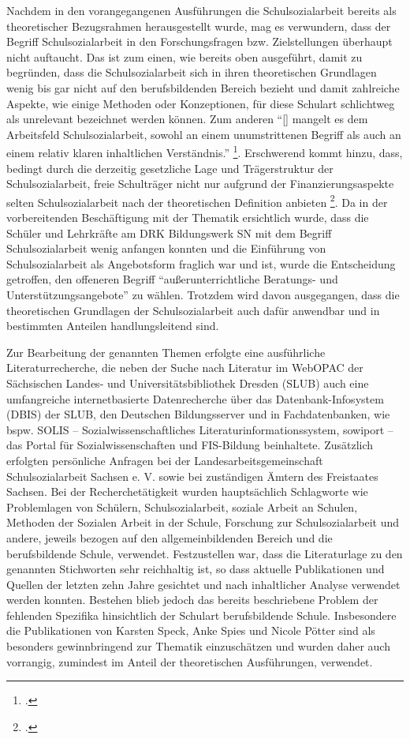 Nachdem in den vorangegangenen Ausführungen die Schulsozialarbeit bereits als theoretischer Bezugsrahmen herausgestellt wurde, mag es verwundern, dass der Begriff Schulsozialarbeit in den Forschungsfragen bzw. Zielstellungen überhaupt nicht auftaucht. Das ist zum einen, wie bereits oben ausgeführt, damit zu begründen, dass die Schulsozialarbeit sich in ihren theoretischen Grundlagen wenig bis gar nicht auf den berufsbildenden Bereich bezieht und damit zahlreiche Aspekte, wie einige Methoden oder Konzeptionen, für diese Schulart schlichtweg als unrelevant bezeichnet werden können. Zum anderen "`[\punkte] mangelt es dem Arbeitsfeld Schulsozialarbeit, sowohl an einem unumstrittenen Begriff als auch an einem relativ klaren inhaltlichen Verständnis."' \footcite[23]{Speck2007}. Erschwerend kommt hinzu, dass, bedingt durch die derzeitig gesetzliche Lage und Trägerstruktur der Schulsozialarbeit, freie Schulträger nicht nur aufgrund der Finanzierungsaspekte selten Schulsozialarbeit nach der theoretischen Definition anbieten \footcite[vgl.][116]{Stuewe2015}. Da in der vorbereitenden Beschäftigung mit der Thematik ersichtlich wurde, dass die Schüler und Lehrkräfte am DRK Bildungswerk SN mit dem Begriff Schulsozialarbeit wenig anfangen konnten und die Einführung von Schulsozialarbeit als Angebotsform fraglich war und ist, wurde die Entscheidung getroffen, den offeneren Begriff "`außerunterrichtliche Beratungs- und Unterstützungsangebote"' zu wählen. Trotzdem wird davon ausgegangen, dass die theoretischen Grundlagen der Schulsozialarbeit auch dafür anwendbar und in bestimmten Anteilen handlungsleitend sind.
 
Zur Bearbeitung der genannten Themen erfolgte eine ausführliche Literaturrecherche, die neben der Suche nach Literatur im WebOPAC der Sächsischen Landes- und Universitätsbibliothek Dresden (SLUB) auch eine umfangreiche internetbasierte Datenrecherche über das Datenbank-Infosystem (DBIS) der SLUB, den Deutschen Bildungsserver und in Fachdatenbanken, wie bspw. SOLIS -- Sozialwissenschaftliches Literaturinformationssystem, sowiport -- das Portal für Sozialwissenschaften und FIS-Bildung beinhaltete. Zusätzlich erfolgten persönliche Anfragen bei der Landesarbeitsgemeinschaft Schulsozialarbeit Sachsen e. V. sowie bei zuständigen Ämtern des Freistaates Sachsen. Bei der Recherchetätigkeit wurden hauptsächlich Schlagworte wie Problemlagen von Schülern, Schulsozialarbeit, soziale Arbeit an Schulen, Methoden der Sozialen Arbeit in der Schule, Forschung zur Schulsozialarbeit und andere, jeweils bezogen auf den allgemeinbildenden Bereich und die berufsbildende Schule, verwendet. Festzustellen war, dass die Literaturlage zu den genannten Stichworten sehr reichhaltig ist, so dass aktuelle Publikationen und Quellen der letzten zehn Jahre gesichtet und nach inhaltlicher Analyse verwendet werden konnten. Bestehen blieb jedoch das bereits beschriebene Problem der fehlenden Spezifika hinsichtlich der Schulart berufsbildende Schule. Insbesondere die Publikationen von Karsten Speck, Anke Spies und Nicole Pötter sind als besonders gewinnbringend zur Thematik einzuschätzen und wurden daher auch vorrangig, zumindest im Anteil der theoretischen Ausführungen, verwendet. 

